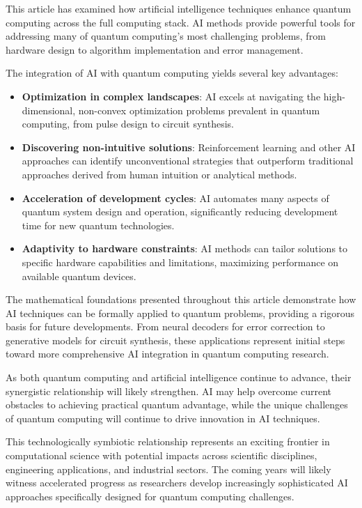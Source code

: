 This article has examined how artificial intelligence techniques enhance quantum computing across the full computing stack. AI methods provide powerful tools for addressing many of quantum computing's most challenging problems, from hardware design to algorithm implementation and error management.

The integration of AI with quantum computing yields several key advantages:

\begin{itemize}
    \item \textbf{Optimization in complex landscapes}: AI excels at navigating the high-dimensional, non-convex optimization problems prevalent in quantum computing, from pulse design to circuit synthesis.
    
    \item \textbf{Discovering non-intuitive solutions}: Reinforcement learning and other AI approaches can identify unconventional strategies that outperform traditional approaches derived from human intuition or analytical methods.
    
    \item \textbf{Acceleration of development cycles}: AI automates many aspects of quantum system design and operation, significantly reducing development time for new quantum technologies.
    
    \item \textbf{Adaptivity to hardware constraints}: AI methods can tailor solutions to specific hardware capabilities and limitations, maximizing performance on available quantum devices.
\end{itemize}

The mathematical foundations presented throughout this article demonstrate how AI techniques can be formally applied to quantum problems, providing a rigorous basis for future developments. From neural decoders for error correction to generative models for circuit synthesis, these applications represent initial steps toward more comprehensive AI integration in quantum computing research.

As both quantum computing and artificial intelligence continue to advance, their synergistic relationship will likely strengthen. AI may help overcome current obstacles to achieving practical quantum advantage, while the unique challenges of quantum computing will continue to drive innovation in AI techniques.

This technologically symbiotic relationship represents an exciting frontier in computational science with potential impacts across scientific disciplines, engineering applications, and industrial sectors. The coming years will likely witness accelerated progress as researchers develop increasingly sophisticated AI approaches specifically designed for quantum computing challenges. 